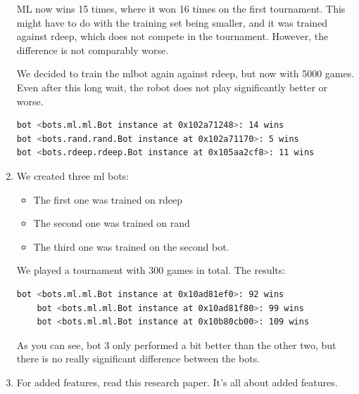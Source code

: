 \documentclass[a4paper,11pt]{article}
\begin{document}
\begin{enumerate}
ML now wins 15 times, where it won 16 times on the first tournament. This might have to do with the training set being smaller, and it was trained against rdeep, which does not compete in the tournament. However, the difference is not comparably worse.

We decided to train the mlbot again against rdeep, but now with 5000 games. 
Even after this long wait, the robot does not play significantly better or worse.

\begin{lstlisting}[language=bash]
bot <bots.ml.ml.Bot instance at 0x102a71248>: 14 wins
bot <bots.rand.rand.Bot instance at 0x102a71170>: 5 wins
bot <bots.rdeep.rdeep.Bot instance at 0x105aa2cf8>: 11 wins
\end{lstlisting}

\item We created three ml bots:
\begin{itemize}
\item The first one was trained on rdeep
\item The second one was trained on rand
\item The third one was trained on the second bot.
\end{itemize}

We played a tournament with 300 games in total. The results:
\begin{lstlisting}[language=bash]
    bot <bots.ml.ml.Bot instance at 0x10ad81ef0>: 92 wins
    bot <bots.ml.ml.Bot instance at 0x10ad81f80>: 99 wins
    bot <bots.ml.ml.Bot instance at 0x10b80cb00>: 109 wins
\end{lstlisting}
As you can see, bot 3 only performed a bit better than the other two, but there is no really significant difference between the bots.

\item For added features, read this research paper. It's all about added features.

\end{enumerate}
\end{document}
